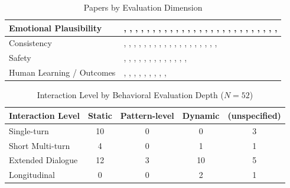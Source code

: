 \begin{table}[tbp]
\begin{tabular}{p{5cm}p{10cm}}
\midrule
Emotional Plausibility & \cite{Berrezueta-Guzman2024Future}, \cite{Cai2026Exploring}, \cite{Chen2023LLM-empowered}, \cite{Chen2025MIND}, \cite{Gabriel2024Can}, \cite{Haydarov2025Towards}, \cite{Kang2024Can}, \cite{Kim2025Can}, \cite{Kim2025MIRROR}, \cite{Kuhail2025Human-Human}, \cite{Liu2023ChatCounselor}, \cite{Liu2025Eeyore}, \cite{Ozgun2025Trustworthy}, \cite{Qiu2026PsyCLIENT}, \cite{Schmidgall2025AgentClinic}, \cite{Schmidmaier2025Using}, \cite{Sharma2023Cognitive}, \cite{Wang2024PATIENT}, \cite{Wang2024Towards}, \cite{Wang2025CARE-Bench}, \cite{Wang2025Feel}, \cite{Wang2025Psychological}, \cite{Xiao2024HealMe}, \cite{Xie2025PsyDT}, \cite{Xu2025MentalChat16K}, \cite{Xu2025MultiAgentESC}, \cite{Yang2025CAMI}, \cite{Zhang2025CBT-BENCH} \\
\midrule
Consistency & \cite{Berrezueta-Guzman2024Future}, \cite{Chen2023LLM-empowered}, \cite{Chen2025MIND}, \cite{Chiu2024A}, \cite{Fouda2026PsychiatryBench}, \cite{Gabriel2024Can}, \cite{Haydarov2025Towards}, \cite{Kim2025KMI}, \cite{Li2024Understanding}, \cite{Liu2025Eeyore}, \cite{Louie2024Roleplay-doh}, \cite{Ozgun2025Trustworthy}, \cite{Qiu2026PsyCLIENT}, \cite{Wang2024Towards}, \cite{Wang2025AnnaAgent}, \cite{Wang2025CARE-Bench}, \cite{Wang2025Psychological}, \cite{Xiao2024HealMe}, \cite{Yang2025CAMI}, \cite{Yang2025Consistent} \\
\midrule
Safety & \cite{Basar2024To}, \cite{Basar2025How}, \cite{Berrezueta-Guzman2024Future}, \cite{Cai2026Exploring}, \cite{Fouda2026PsychiatryBench}, \cite{Gabriel2024Can}, \cite{Li2024Understanding}, \cite{Qiu2025EmoAgent}, \cite{Samuel2025PersonaGym}, \cite{Sharma2023Cognitive}, \cite{Wang2024Towards}, \cite{Xiao2024HealMe}, \cite{Xie2025PsyDT}, \cite{Xu2025MentalChat16K} \\
\midrule
Human Learning / Outcomes & \cite{Berrezueta-Guzman2024Future}, \cite{Chen2025MIND}, \cite{Feng2025Reframe}, \cite{Li2024Understanding}, \cite{Louie2026Can}, \cite{Qiu2026PsyCLIENT}, \cite{Tanana2019Development}, \cite{Wang2024PATIENT}, \cite{Wang2025Psychological}, \cite{Xiao2024HealMe} \\

\bottomrule
\end{tabular}
\caption{Papers by Evaluation Dimension}
\label{tab:eval-dimensions-cite}
\end{table}

\begin{table}[tbp]
\centering
\small
\begin{tabular}{lcccc}
\toprule
\textbf{Interaction Level} & \textbf{Static} & \textbf{Pattern-level} & \textbf{Dynamic} & \textbf{(unspecified)} \\
\midrule
Single-turn & 10 & 0 & 0 & 3 \\
Short Multi-turn & 4 & 0 & 1 & 1 \\
Extended Dialogue & 12 & 3 & 10 & 5 \\
Longitudinal & 0 & 0 & 2 & 1 \\
\bottomrule
\end{tabular}
\caption{Interaction Level by Behavioral Evaluation Depth ($N=52$)}
\label{tab:interaction-behavior}
\end{table}

